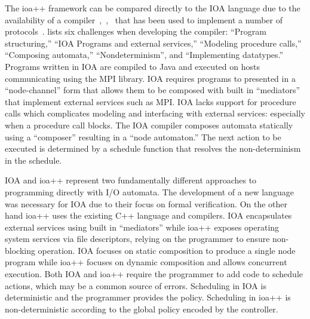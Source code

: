 The ioa++ framework can be compared directly to the IOA language due to the availability of a compiler~\cite{tsai2002code},~\cite{tauber2004verifiable},~\cite{tauber2004compiling} that has been used to implement a number of protocols~\cite{georgiou2009automated}.
\cite{georgiou2009automated} lists six challenges when developing the compiler: ``Program structuring,'' ``IOA Programs and external services,'' ``Modeling procedure calls,'' ``Composing automata,'' ``Nondeterminism'', and ``Implementing datatypes.''
Programs written in IOA are compiled to Java and executed on hosts communicating using the MPI library.
IOA requires programs to presented in a ``node-channel'' form that allows them to be composed with built in ``mediators'' that implement external services such as MPI.
IOA lacks support for procedure calls which complicates modeling and interfacing with external services: especially when a procedure call blocks.
The IOA compiler composes automata statically using a ``composer'' resulting in a ``node automaton.''
The next action to be executed is determined by a schedule function that resolves the non-determinism in the schedule.

IOA and ioa++ represent two fundamentally different approaches to programming directly with I/O automata.
The development of a new language was necessary for IOA due to their focus on formal verification.
On the other hand ioa++ uses the existing C++ language and compilers.
IOA encapsulates external services using built in ``mediators'' while ioa++ exposes operating system services via file descriptors, relying on the programmer to ensure non-blocking operation.
IOA focuses on static composition to produce a single node program while ioa++ focuses on dynamic composition and allows concurrent execution.
Both IOA and ioa++ require the programmer to add code to schedule actions, which may be a common source of errors.
Scheduling in IOA is deterministic and the programmer provides the policy.
Scheduling in ioa++ is non-deterministic according to the global policy encoded by the controller.










